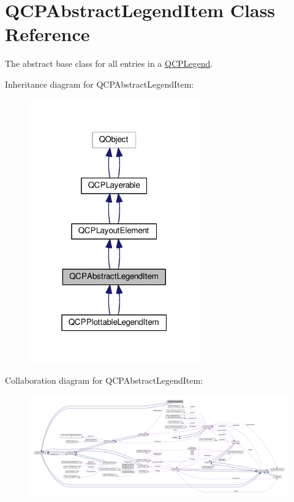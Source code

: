 \hypertarget{class_q_c_p_abstract_legend_item}{}\section{Q\+C\+P\+Abstract\+Legend\+Item Class Reference}
\label{class_q_c_p_abstract_legend_item}


The abstract base class for all entries in a \hyperlink{class_q_c_p_legend}{Q\+C\+P\+Legend}.  




Inheritance diagram for Q\+C\+P\+Abstract\+Legend\+Item\+:\nopagebreak
\begin{figure}[H]
\begin{center}
\leavevmode
\includegraphics[width=208pt]{class_q_c_p_abstract_legend_item__inherit__graph}
\end{center}
\end{figure}


Collaboration diagram for Q\+C\+P\+Abstract\+Legend\+Item\+:\nopagebreak
\begin{figure}[H]
\begin{center}
\leavevmode
\includegraphics[width=350pt]{class_q_c_p_abstract_legend_item__coll__graph}
\end{center}
\end{figure}
